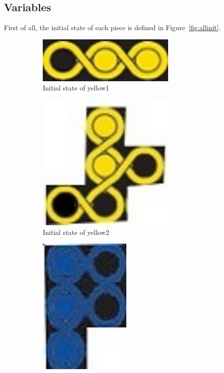 \subsection{Variables}
First of all, the initial state of each piece is defined in Figure~\ref{fig:allinit}.
\begin{figure}[htbp]
\begin{subfigure}[b]{.24\textwidth}
\centering
\includegraphics[width=0.75\textwidth]{figs/yellow1.jpg}
\caption{Initial state of yellow1}
  \label{fig:2Dyellow1}
\end{subfigure}
\begin{subfigure}[b]{.24\textwidth}
\centering
\includegraphics[width=0.75\textwidth]{figs/yellow2.jpg}
\caption{Initial state of yellow2}
  \label{fig:2Dyellow2}
\end{subfigure}
\begin{subfigure}[b]{.24\textwidth}
\centering
\includegraphics[width =0.5\textwidth]{figs/blue1.jpg}

\end{subfigure}
\end{figure}
